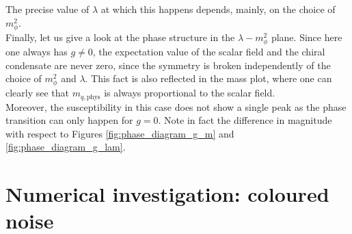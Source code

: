 The precise value of $\lambda$ at which this happens depends, mainly, on the choice of $m_\phi^2$. \\
Finally, let us give a look at the phase structure in the $\lambda - m_\phi^2$ plane. 
Since here one always has $g \neq 0$, the expectation value of the scalar field and the chiral condensate are never zero, since the symmetry is broken independently of the choice of $m_\phi^2$ and $\lambda$. This fact is also reflected in the mass plot,
where one can clearly see that $m_{q,\text{phys}}$ is always proportional to the scalar field. \\
Moreover, the susceptibility in this case does not show a single peak as the phase transition can only happen for $g=0$. Note in fact the difference in magnitude with respect to Figures \ref{fig:phase_diagram_g_m} and \ref{fig:phase_diagram_g_lam}.

\chapter{Numerical investigation: coloured noise}
\label{chapt:results_coloured}

